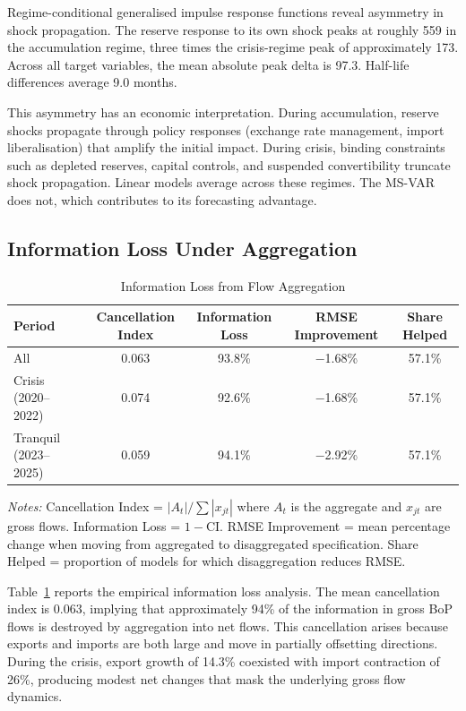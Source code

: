 \documentclass[12pt,a4paper]{article}
\begin{document}
Regime-conditional generalised impulse response functions reveal asymmetry in shock propagation. The reserve response to its own shock peaks at roughly 559 in the accumulation regime, three times the crisis-regime peak of approximately 173. Across all target variables, the mean absolute peak delta is 97.3. Half-life differences average 9.0 months.

This asymmetry has an economic interpretation. During accumulation, reserve shocks propagate through policy responses (exchange rate management, import liberalisation) that amplify the initial impact. During crisis, binding constraints such as depleted reserves, capital controls, and suspended convertibility truncate shock propagation. Linear models average across these regimes. The MS-VAR does not, which contributes to its forecasting advantage.

\subsection{Information Loss Under Aggregation}

\begin{table}[htbp]
\centering
\caption{Information Loss from Flow Aggregation}
\label{tab:info_loss}
\begin{tabular}{lcccc}
\toprule
Period & Cancellation Index & Information Loss & RMSE Improvement & Share Helped \\
\midrule
All & 0.063 & 93.8\% & $-$1.68\% & 57.1\% \\
Crisis (2020--2022) & 0.074 & 92.6\% & $-$1.68\% & 57.1\% \\
Tranquil (2023--2025) & 0.059 & 94.1\% & $-$2.92\% & 57.1\% \\
\bottomrule
\end{tabular}
\begin{tablenotes}
\small
\item \textit{Notes:} Cancellation Index = $|A_t|/\sum|x_{jt}|$ where $A_t$ is the aggregate and $x_{jt}$ are gross flows. Information Loss = $1 - \text{CI}$. RMSE Improvement = mean percentage change when moving from aggregated to disaggregated specification. Share Helped = proportion of models for which disaggregation reduces RMSE.
\end{tablenotes}
\end{table}

Table~\ref{tab:info_loss} reports the empirical information loss analysis. The mean cancellation index is 0.063, implying that approximately 94\% of the information in gross BoP flows is destroyed by aggregation into net flows. This cancellation arises because exports and imports are both large and move in partially offsetting directions. During the crisis, export growth of 14.3\% coexisted with import contraction of 26\%, producing modest net changes that mask the underlying gross flow dynamics.
\end{document}
